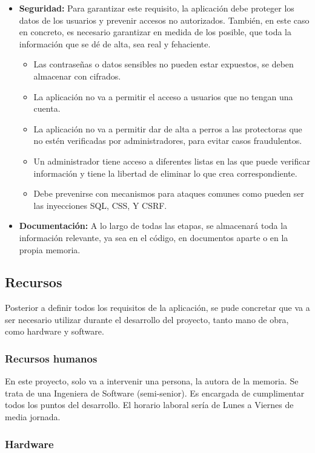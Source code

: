 \documentclass[a4paper, 12pt]{article}
\begin{document}
\begin{itemize}
\begin{itemize}
		\end{itemize}
	\item \textbf{Seguridad:} Para garantizar este requisito, la aplicación debe proteger los datos de los usuarios y prevenir accesos no autorizados. También, en este caso en concreto, es necesario garantizar en medida de los posible, que toda la información que se dé de alta, sea real y fehaciente.
		\begin{itemize}
			\item Las contraseñas o datos sensibles no pueden estar expuestos, se deben almacenar con cifrados.
			\item La aplicación no va a permitir el acceso a usuarios que no tengan una cuenta.
			\item La aplicación no va a permitir dar de alta a perros a las protectoras que no estén verificadas por administradores, para evitar casos fraudulentos.
			\item Un administrador tiene acceso a diferentes listas en las que puede verificar información y tiene la libertad de eliminar lo que crea correspondiente.
			\item Debe prevenirse con mecanismos para ataques comunes como pueden ser las inyecciones SQL, CSS, Y CSRF. 
		\end{itemize}
	\item \textbf{Documentación:} A lo largo de todas las etapas, se almacenará toda la información relevante, ya sea en el código, en documentos aparte o en la propia memoria.
\end{itemize}

\subsection{Recursos}
Posterior a definir todos los requisitos de la aplicación, se pude concretar que va a ser necesario utilizar durante el desarrollo del proyecto, tanto mano de obra, como hardware y software.

\subsubsection{Recursos humanos}

En este proyecto, solo va a intervenir una persona, la autora de la memoria. Se trata de una Ingeniera de Software (semi-senior). Es encargada de cumplimentar todos los puntos del desarrollo. El horario laboral sería de Lunes a Viernes de media jornada.


\subsubsection{Hardware}
\end{document}
